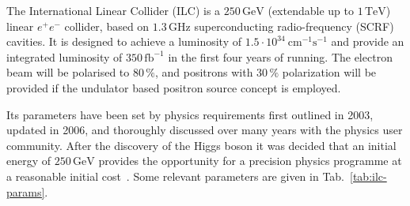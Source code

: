 

The International Linear Collider (ILC) is a $250\,{\mathrm{GeV}}$ (extendable up to $1\,{\mathrm{TeV}}$) linear $e^+e^-$ collider, based on $1.3\,{\mathrm{GHz}}$ superconducting radio-frequency (SCRF) cavities.
It is designed to  achieve a luminosity of $1.5\cdot 10^{34}~{\mathrm{cm}}^{-1}{\mathrm{s}}^{-1}$ and provide an integrated luminosity of $350\,{\mathrm{fb}}^{-1}$ in the first four years of running.
The electron beam will be polarised to $80\,\%$, and positrons with $30\,\%$ polarization will be provided if the undulator based positron source concept is employed. 

Its parameters have been set by physics requirements first outlined in 2003,
updated in 2006, and thoroughly discussed over many years with the physics user community. 
After the discovery of the Higgs boson it was decided that an initial energy of $250\,{\mathrm{GeV}}$ provides the opportunity for a precision physics programme at a reasonable initial cost~\cite{Evans:2017rvt}.
Some relevant parameters are given in Tab.~\ref{tab:ilc-params}.

